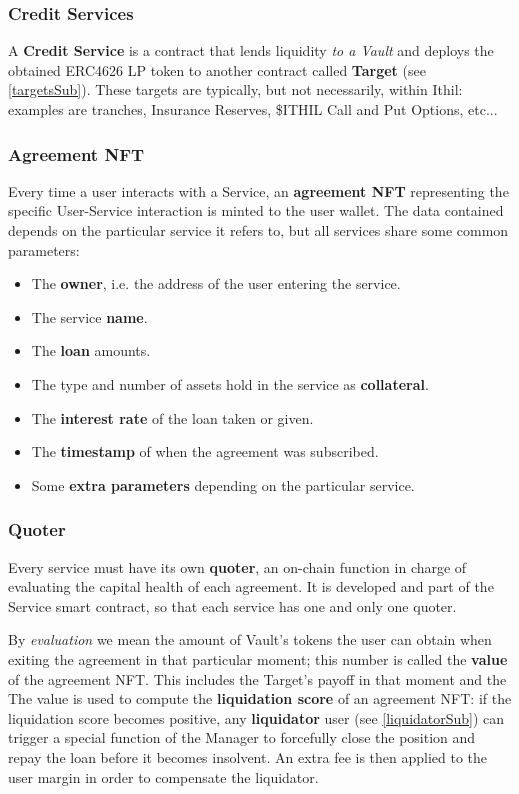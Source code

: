 \documentclass[a4paper,10 pt]{article}
\theoremstyle{definition}
\begin{document}
\subsubsection{Credit Services}\label{creditSubSub}
A {\bf Credit Service} is a contract that lends liquidity {\it to a Vault} and deploys the obtained ERC4626 LP token to another contract called {\bf Target} (see \ref{targetsSub}). These targets are typically, but not necessarily, within Ithil: examples are tranches, Insurance Reserves, \$ITHIL Call and Put Options, etc...

\subsubsection{Agreement NFT}\label{posNftSubSub}

Every time a user interacts with a Service, an {\bf agreement NFT} representing the specific User-Service interaction is minted to the user wallet. The data contained depends on the particular service it refers to, but all services share some common parameters:
\begin{itemize}
\item The {\bf owner}, i.e. the address of the user entering the service.
\item The service {\bf name}.
\item The {\bf loan} amounts.
\item The type and number of assets hold in the service as {\bf collateral}.
\item The {\bf interest rate} of the loan taken or given.
\item The {\bf timestamp} of when the agreement was subscribed.
\item Some {\bf extra parameters} depending on the particular service.
\end{itemize}

\subsubsection{Quoter}\label{quoterSubSub}
Every service must have its own {\bf quoter}, an on-chain function in charge of evaluating the capital health of each agreement. It is developed and part of the Service smart contract, so that each service has one and only one quoter.

By {\it evaluation} we mean the amount of Vault's tokens the user can obtain when exiting the agreement in that particular moment; this number is called the {\bf value} of the agreement NFT. This includes the Target's payoff in that moment and the  The value is used to compute the {\bf liquidation score} of an agreement NFT: if the liquidation score becomes positive, any {\bf liquidator} user (see \ref{liquidatorSub}) can trigger a special function of the Manager to forcefully close the position and repay the loan before it becomes insolvent. An extra fee is then applied to the user margin in order to compensate the liquidator.
\end{document}
